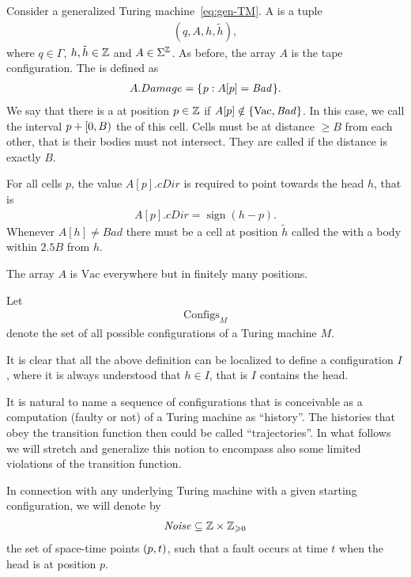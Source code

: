 \documentclass[12pt]{memoir}
\newcommand{\fld}[1]{\ensuremath{\textit{#1}}}
\newcommand{\sign}{\mathop\mathrm{sign}}
\def\B{B}
\newcommand{\Bad}{\mathit{Bad}}
\newcommand{\Configs}{\mathrm{Configs}}
\newcommand{\Damage}{Damage}
\newcommand{\h}{h}
\newcommand{\hc}{\tilde h}
\newcommand{\Noise}{\mathit{Noise}}
\newcommand{\cDir}{\fld{cDir}}
\newcommand{\Vacant}{\mathrm{Vac}}
\begin{document}
\begin{definition}[Configuration]\label{def:config}
     Consider a generalized Turing machine~\eqref{eq:gen-TM}.
    A  is a tuple
        \begin{align*}
             (q,A,\h,\hc),
        \end{align*}
    where \( q\in\Gamma \), \( \h,\hc\in\bbZ \) and \( A\in\Sigma^{\mathbb{Z}} \).
As before, the array \( A \) is the tape configuration.
The  is defined as
     \begin{align*}
          A.\Damage=\setOf{p}{A[p]=\Bad}.
     \end{align*}
We say that there is a  at position \( p\in\mathbb{Z} \) if
\( A[p]\notin \set{\Vacant, \Bad} \).
In this case, we call the interval \( p+\lint{0}{\B} \) the  of this cell.
Cells must be at distance \( \ge\B \) from each other, that is their
bodies must not intersect.
They are called  if the distance is exactly \( \B \).

For all cells \( p \), the value \( A[p].\cDir \) is required to point towards 
the head \( \h \), that is 
 \begin{align*}
   A[p].\cDir=\sign(\h-p).
 \end{align*}
Whenever \( A[\h]\neq \Bad \) there must be a
cell at position \( \hc \) called the  with a body 
within \( 2.5\B \) from \( \h \).

The array \( A \) is \( \Vacant \) everywhere but in finitely many positions.

Let
    \begin{align*}
         \Configs_{M}
    \end{align*}
    denote the set of all possible configurations
    of a Turing machine \( M \).

It is clear that all the above definition can be localized to define a configuration
 \( I \), where it is always understood that \( \h\in I \), that is 
\( I \) contains the head.
\end{definition}

It is natural to name a sequence of configurations that is conceivable as a computation
(faulty or not) of a Turing machine as ``history''.
The histories that obey the transition function then could be called ``trajectories''.
In what follows we will 
stretch and generalize this notion to encompass also some limited violations of the
transition function.

In connection with any underlying Turing machine with a given starting configuration, we will
denote by
\begin{align}\label{eq:noise-first}
   \Noise\subseteq \bbZ\times \bbZ_{\ge 0}
\end{align}
the set of space-time points \( (p,t) \), such that
a fault occurs at time \( t \) when the head is at position \( p \).
\end{document}
